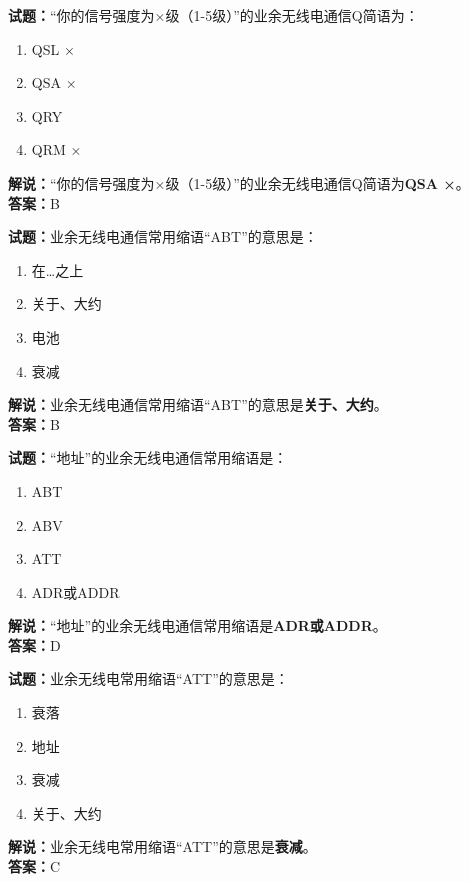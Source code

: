\documentclass{ctexbook}
\begin{document}
\bigskip


\noindent\textbf{试题：}“你的信号强度为×级（1-5级）”的业余无线电通信Q简语为：
\begin{enumerate}[leftmargin=3em]
\item QSL ×
\item QSA ×
\item QRY
\item QRM ×
\end{enumerate}
\noindent\textbf{解说：}“你的信号强度为×级（1-5级）”的业余无线电通信Q简语为\textbf{QSA ×}。\\\noindent\textbf{答案：}B



\bigskip


\noindent\textbf{试题：}业余无线电通信常用缩语“ABT”的意思是：
\begin{enumerate}[leftmargin=3em]
\item 在…之上
\item 关于、大约
\item 电池
\item 衰减
\end{enumerate}
\noindent\textbf{解说：}业余无线电通信常用缩语“ABT”的意思是\textbf{关于、大约}。\\\noindent\textbf{答案：}B


\bigskip


\noindent\textbf{试题：}“地址”的业余无线电通信常用缩语是：
\begin{enumerate}[leftmargin=3em]
\item ABT
\item ABV
\item ATT
\item ADR或ADDR
\end{enumerate}
\noindent\textbf{解说：}“地址”的业余无线电通信常用缩语是\textbf{ADR或ADDR}。\\\noindent\textbf{答案：}D




\bigskip


\noindent\textbf{试题：}业余无线电常用缩语“ATT”的意思是：
\begin{enumerate}[leftmargin=3em]
\item 衰落
\item 地址
\item 衰减
\item 关于、大约
\end{enumerate}
\noindent\textbf{解说：}业余无线电常用缩语“ATT”的意思是\textbf{衰减}。\\\noindent\textbf{答案：}C
\end{document}
